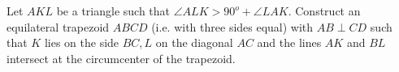 Let $AKL$ be a triangle such that $\angle ALK > 90^o +\angle LAK$. Construct an equilateral trapezoid $ABCD$ (i.e. with three sides equal) with $AB \perp CD$ such that $K$ lies on the side $BC, L$ on the diagonal $AC$ and the lines $AK$ and $BL$ intersect at the circumcenter of the trapezoid.